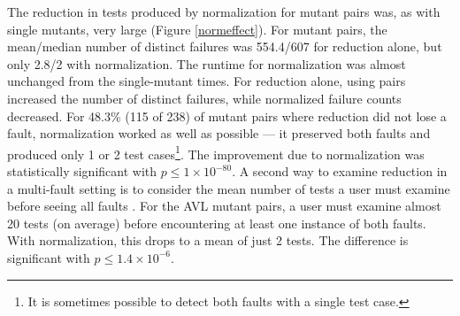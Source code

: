 The reduction in tests produced by normalization for mutant pairs
was, as with single mutants, very large (Figure \ref{normeffect}).
For mutant pairs, the mean/median number of distinct failures was
554.4/607 for reduction alone, but only 2.8/2 with
normalization.  The runtime for normalization was almost
unchanged from the single-mutant times.  For reduction
alone, using pairs increased the number of distinct failures, while
normalized failure counts decreased.  For 48.3\% (115 of 238) of
mutant pairs where reduction did not lose a fault, normalization
worked as well as possible --- it preserved both faults and produced only 1 or 2 test
cases\footnote{It is sometimes possible to detect both faults with a single test
  case.}.  The improvement due to normalization was
statistically significant with $p\leq1\times10^{-80}$.
A second way to examine reduction in a multi-fault setting is to
consider the mean number of tests a user must examine before seeing
all faults \cite{PLDI13}.  For the AVL mutant pairs, a user must
examine almost 20 tests (on average) before encountering at least
one instance of both faults.  With normalization, this  drops
to a mean of just 2 tests.  The difference is significant with $p\leq1.4\times10^{-6}$.

